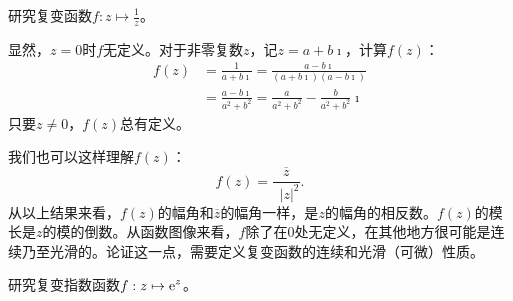 \documentclass[12pt,UTF8,fontset=none]{ctexbook}
\begin{document}
\begin{et}
    研究复变函数$\displaystyle f: z \mapsto \frac{1}{z}$。
\end{et}

\begin{so}
    显然，$z = 0$时$f$无定义。对于非零复数$z$，记$z = a + b\imath $，计算$f(z)$：
    \begin{align*}
        f(z) &= \frac{1}{a + b\imath} = \frac{a - b\imath}{(a + b\imath)(a - b\imath)} \\
        &= \frac{a - b\imath}{a^2 + b^2} = \frac{a}{a^2 + b^2} - \frac{b}{a^2 + b^2} \imath
    \end{align*}
    只要$z \neq 0$，$f(z)$总有定义。

    我们也可以这样理解$f(z)$：
    $$ f(z) = \frac{\overline{z}}{\phantom{z}|z|^2}. $$
    从以上结果来看，$f(z)$的幅角和$\overline{z}$的幅角一样，是$z$的幅角的相反数。$f(z)$的模长是$z$的模的倒数。从函数图像来看，$f$除了在$0$处无定义，在其他地方很可能是连续乃至光滑的。论证这一点，需要定义复变函数的连续和光滑（可微）性质。
\end{so}

\begin{et}
    研究复变指数函数$\displaystyle f: z \mapsto \mathrm{e}^z$。
\end{et}
\end{document}
